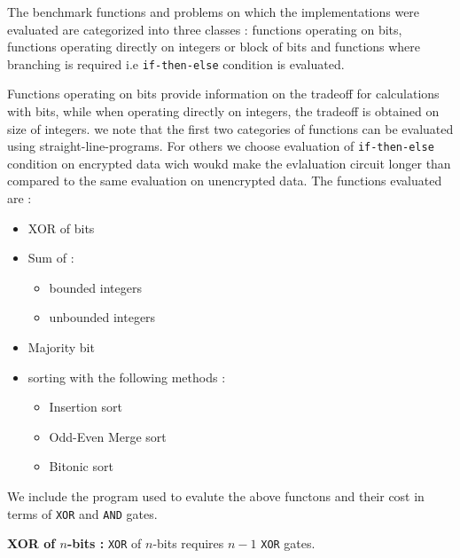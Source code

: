 \documentclass{acm_proc_article-sp}
\begin{document}
The benchmark functions and problems on which the implementations were evaluated are categorized into three classes : functions operating on bits, functions operating directly on integers or block of bits and functions where branching is required i.e \texttt{if-then-else} condition is evaluated. 

Functions operating on bits provide information on the tradeoff for calculations with bits, while when operating directly on integers, the tradeoff is obtained on size of integers. we note that the first two categories of functions can be evaluated using straight-line-programs. For others we choose evaluation of \texttt{if-then-else} condition on encrypted data  wich woukd make the evlaluation circuit longer than compared to the same evaluation on unencrypted data. The functions evaluated are : 

\begin{itemize}

\item XOR of bits
\item Sum of : 

	\begin{itemize}

		\item  bounded integers

		\item unbounded integers

 	\end{itemize}
\item Majority bit

\item sorting with the following methods :

	\begin{itemize}

		\item Insertion sort

		\item Odd-Even Merge sort

		\item Bitonic sort

	\end{itemize}

\end{itemize}

We include the program used to evalute the above functons and their cost in terms of \texttt{XOR} and \texttt{AND} gates. 

\textbf{XOR of $n$-bits :} \texttt{XOR} of $n$-bits requires $n-1$ \texttt{XOR} gates. 
\end{document}
